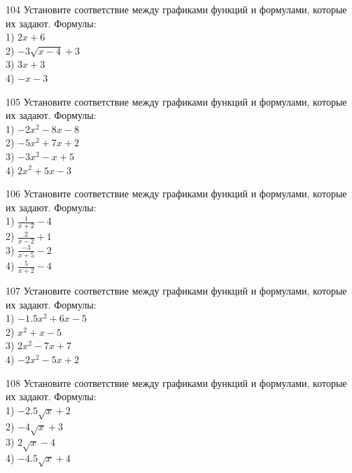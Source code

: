 \documentclass[4apaper]{article}
\begin{document}
\begin{taskBN}{104}
Установите соответствие между графиками функций и формулами, которые их задают. Формулы: \\1) $2x+6$\\2) $-3\sqrt{x-4}+3$\\3) $3x+3$\\4) $-x-3$
\end{taskBN}

\begin{taskBN}{105}
Установите соответствие между графиками функций и формулами, которые их задают. Формулы: \\1) $-2x^2-8x-8$\\2) $-5x^2+7x+2$\\3) $-3x^2-x+5$\\4) $2x^2+5x-3$
\end{taskBN}

\begin{taskBN}{106}
Установите соответствие между графиками функций и формулами, которые их задают. Формулы: \\1) $\frac{1}{x+2}-4$\\2) $\frac{2}{x-2}+1$\\3) $\frac{-3}{x+5}-2$\\4) $\frac{5}{x+2}-4$
\end{taskBN}

\begin{taskBN}{107}
Установите соответствие между графиками функций и формулами, которые их задают. Формулы: \\1) $-1.5x^2+6x-5$\\2) $x^2+x-5$\\3) $2x^2-7x+7$\\4) $-2x^2-5x+2$
\end{taskBN}

\begin{taskBN}{108}
Установите соответствие между графиками функций и формулами, которые их задают. Формулы: \\1) $-2.5\sqrt{x}+2$\\2) $-4\sqrt{x}+3$\\3) $2\sqrt{x}-4$\\4) $-4.5\sqrt{x}+4$
\end{taskBN}
\end{document}
